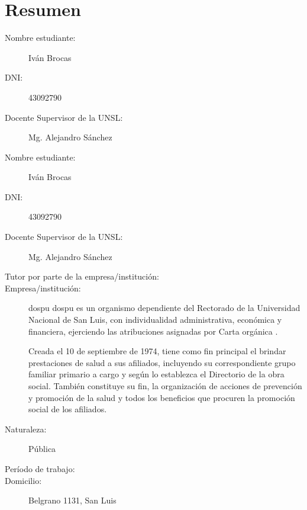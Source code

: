 \section{Resumen}

\begin{description}
    \item[Nombre estudiante:] Iván Brocas
    \item[DNI:] 43092790
    \item[Docente Supervisor de la UNSL:] Mg. Alejandro Sánchez
    \item[Nombre estudiante:] Iván Brocas 
    \item[DNI:] 43092790
    \item[Docente Supervisor de la UNSL:] Mg. Alejandro Sánchez 
    \item[Tutor por parte de la empresa/institución:] %
    \item[Empresa/institución:] \acrfull{dospu}
    \acrshort{dospu} es un organismo dependiente del Rectorado de la Universidad Nacional de San Luis, con individualidad administrativa, económica y financiera, ejerciendo las atribuciones asignadas por Carta orgánica \cite{CSOrd53}.

    Creada el 10 de septiembre de 1974, tiene como fin principal el brindar prestaciones de salud a sus afiliados, incluyendo su correspondiente grupo familiar primario a cargo y según lo establezca el Directorio de la obra social. También constituye su fin, la organización de acciones de prevención y promoción de la salud y todos los beneficios que procuren la promoción social de los afiliados. 
    \item[Naturaleza:] Pública
    \item[Período de trabajo:] %
    \item[Domicilio:] Belgrano 1131, San Luis 
\end{description}


